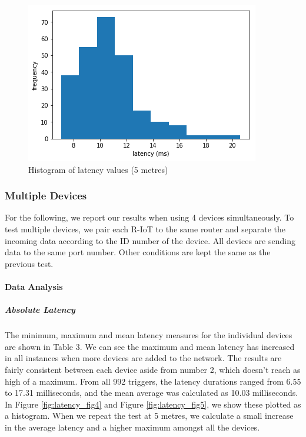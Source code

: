
\begin{figure}[ht]
  \centering
    \includegraphics[width=\textwidth]{Chapters/Figures/technical/Latency/figure3.png}
    \caption{Histogram of latency values (5 metres)}
    \label{fig:latency_fig3}
\end{figure}

\subsubsection{Multiple Devices}

For the following, we report our results when using 4 devices simultaneously. To test multiple devices, we pair each R-IoT to the same router and separate the incoming data according to the ID number of the device. All devices are sending data to the same port number. Other conditions are kept the same as the previous test.

\paragraph{Data Analysis}

\subparagraph{Absolute Latency}
The minimum, maximum and mean latency measures for the individual devices are shown in Table 3. We can see the maximum and mean latency has increased in all instances when more devices are added to the network. The results are fairly consistent between each device aside from number 2, which doesn’t reach as high of a maximum. From all 992 triggers, the latency durations ranged from 6.55 to 17.31 milliseconds, and the mean average was calculated as 10.03 milliseconds. In Figure \ref{fig:latency_fig4} and Figure \ref{fig:latency_fig5}, we show these plotted as a histogram. When we repeat the test at 5 metres, we calculate a small increase in the average latency and a higher maximum amongst all the devices.

